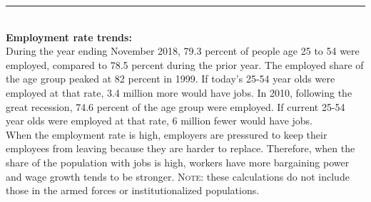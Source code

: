 \documentclass{report}
\newcommand{\dateaxisticks}{
		axis line style={draw=none},
		max space between ticks=38,	 
		xmin={1997-01-01},
		xtick={
			{1995-01-01},
			{2000-01-01},
			{2005-01-01},
			{2010-01-01},
			{2015-01-01}},
	    minor xtick={
	    	{1994-01-01}, {1996-01-01}, {1997-01-01}, {1998-01-01}, {1999-01-01},
			{2001-01-01}, {2002-01-01}, {2003-01-01}, {2004-01-01}, 
	    	{2006-01-01}, {2007-01-01}, {2008-01-01}, {2009-01-01},
	      	{2011-01-01}, {2012-01-01}, {2013-01-01}, {2014-01-01},
	      	{2016-01-01}, {2017-01-01}, {2018-01-01}, {2019-01-01}},
	    enlarge y limits={0.08},
	    enlarge x limits={0.12},}
\newcommand{\lastpt}[1]{node[circle, 
		minimum size=3pt, inner sep=0pt, draw, fill, pos=1](#1){};}
\begin{document}
\noindent \begin{minipage}[t]{0.48\textwidth}

\noindent \textcolor{blue}{\rule[-6pt]{90mm}{24pt}}
		\vspace{-6mm}
		
		\hspace{1mm} \textcolor{white}{}
\vspace{1.1mm}

\hspace{0.8mm} 
\vspace{4mm}\\
\textbf{Employment rate trends:}
\vspace{2mm}\\
During the year ending November 2018, 79.3 percent of people age 25 to 54 were employed, compared to 78.5 percent during the prior year. The employed share of the age group peaked at 82 percent in 1999. If today's 25-54 year olds were employed at that rate, 3.4 million more would have jobs. In 2010, following the great recession, 74.6 percent of the age group were employed. If current 25-54 year olds were employed at that rate, 6 million fewer would have jobs.\\

When the employment rate is high, employers are pressured to keep their employees from leaving because they are harder to replace. Therefore, when the share of the population with jobs is high, workers have more bargaining power and wage growth tends to be stronger. \textsc{Note:} these calculations do not include those in the armed forces or institutionalized populations.\\
\end{minipage}\hfill
\end{document}
